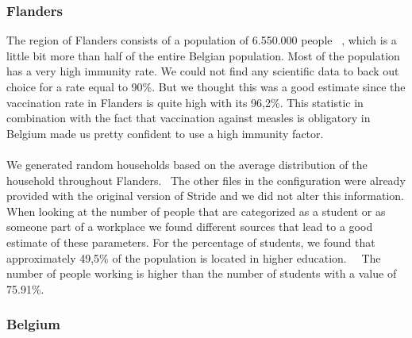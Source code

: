 \documentclass[runningheads]{llncs}
\begin{document}
	\subsubsection{Flanders} 
	The region of Flanders consists of a population of 6.550.000 people ~\cite{1}, which is a little bit more than half of the entire Belgian population. Most of the population has a very high immunity rate. We could not find any scientific data to back out choice for a rate equal to 90\%. But we thought this was a good estimate since the vaccination rate in Flanders is quite high with its 96,2\%. This statistic in combination with the fact that vaccination against measles is obligatory in Belgium made us pretty confident to use a high immunity factor. ~\cite{2} ~\cite{3} ~\cite{4}\\
	\noindent\\
	We generated random households based on the average distribution of the household throughout Flanders.~\cite{5} The other files in the configuration were already provided with the original version of Stride and we did not alter this information. When looking at the number of people that are categorized as a student or as someone part of a workplace we found different sources that lead to a good estimate of these parameters. For the percentage of students, we found that approximately 49,5\% of the population is located in higher education.~\cite{6}~\cite{17} The number of people working is higher than the number of students with a value of 75.91\%.~\cite{7}
	\newpage
	\subsubsection{Belgium}
	
\end{document}
